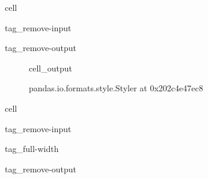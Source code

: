 \documentclass[letterpaper,10pt,english]{jupyterBook}
\begin{document}
\begin{sphinxuseclass}{cell}
\begin{sphinxuseclass}{tag_remove-input}
\begin{sphinxuseclass}{tag_remove-output}
\end{sphinxuseclass}
\end{sphinxuseclass}
\end{sphinxuseclass}
\begin{figure}[htbp]
\centering
\capstart
\begin{sphinxVerbatimOutput}

\begin{sphinxuseclass}{cell_output}
\begin{sphinxVerbatim}[commandchars=\\\{\}]
\PYGZlt{}pandas.io.formats.style.Styler at 0x202c4e47ec8\PYGZgt{}
\end{sphinxVerbatim}

\end{sphinxuseclass}\end{sphinxVerbatimOutput}
\caption{}\label{\detokenize{AppendixB:table17}}\end{figure}

\begin{sphinxuseclass}{cell}
\begin{sphinxuseclass}{tag_remove-input}
\begin{sphinxuseclass}{tag_full-width}
\begin{sphinxuseclass}{tag_remove-output}
\end{sphinxuseclass}
\end{sphinxuseclass}
\end{sphinxuseclass}
\end{sphinxuseclass}
\end{document}

